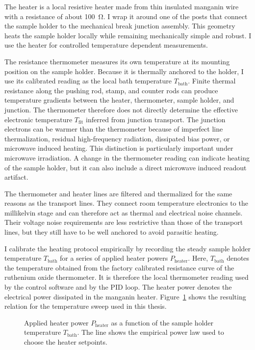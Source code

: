             The heater is a local resistive heater made from thin insulated manganin wire with a resistance of about \qty{100}{\ohm}. I wrap it around one of the posts that connect the sample holder to the mechanical break junction assembly. This geometry heats the sample holder locally while remaining mechanically simple and robust. I use the heater for controlled temperature dependent measurements.

            The resistance thermometer measures its own temperature at its mounting position on the sample holder. Because it is thermally anchored to the holder, I use its calibrated reading as the local bath temperature $T_\mathrm{bath}$. Finite thermal resistance along the pushing rod, stamp, and counter rods can produce temperature gradients between the heater, thermometer, sample holder, and junction. The thermometer therefore does not directly determine the effective electronic temperature $T_\mathrm{fit}$ inferred from junction transport. The junction electrons can be warmer than the thermometer because of imperfect line thermalization, residual high-frequency radiation, dissipated bias power, or microwave induced heating. This distinction is particularly important under microwave irradiation. A change in the thermometer reading can indicate heating of the sample holder, but it can also include a direct microwave induced readout artifact.

            The thermometer and heater lines are filtered and thermalized for the same reasons as the transport lines. They connect room temperature electronics to the millikelvin stage and can therefore act as thermal and electrical noise channels. Their voltage noise requirements are less restrictive than those of the transport lines, but they still have to be well anchored to avoid parasitic heating.

            I calibrate the heating protocol empirically by recording the steady sample holder temperature $T_\mathrm{bath}$ for a series of applied heater powers $P_\mathrm{heater}$. Here, $T_\mathrm{bath}$ denotes the temperature obtained from the factory calibrated resistance curve of the ruthenium oxide thermometer. It is therefore the local thermometer reading used by the control software and by the PID loop. The heater power denotes the electrical power dissipated in the manganin heater. Figure~\ref{fig:methods:setup:thermometry:heater-calibration} shows the resulting relation for the temperature sweep used in this thesis.

            \begin{figure}
                \captionsetup{format=plain}%
                \centering
                \vspace{1.5em}
                \caption{
                        Applied heater power $P_\mathrm{heater}$ as a function of the sample holder temperature $T_\mathrm{bath}$. The line shows the empirical power law used to choose the heater setpoints.
                    }
                \label{fig:methods:setup:thermometry:heater-calibration}
            \end{figure}

